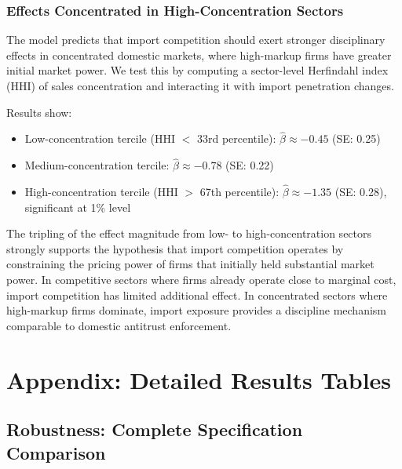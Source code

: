 \documentclass[12pt]{article}
\begin{document}
\subsubsection{Effects Concentrated in High-Concentration Sectors}

The model predicts that import competition should exert stronger disciplinary effects in concentrated domestic markets, where high-markup firms have greater initial market power. We test this by computing a sector-level Herfindahl index (HHI) of sales concentration and interacting it with import penetration changes.

Results show:
\begin{itemize}
    \item Low-concentration tercile (HHI $<$ 33rd percentile): $\hat{\beta} \approx -0.45$ (SE: 0.25)
    \item Medium-concentration tercile: $\hat{\beta} \approx -0.78$ (SE: 0.22)
    \item High-concentration tercile (HHI $>$ 67th percentile): $\hat{\beta} \approx -1.35$ (SE: 0.28), significant at 1\% level
\end{itemize}

The tripling of the effect magnitude from low- to high-concentration sectors strongly supports the hypothesis that import competition operates by constraining the pricing power of firms that initially held substantial market power. In competitive sectors where firms already operate close to marginal cost, import competition has limited additional effect. In concentrated sectors where high-markup firms dominate, import exposure provides a discipline mechanism comparable to domestic antitrust enforcement.

\pagebreak


\appendix

\section{Appendix: Detailed Results Tables}

\subsection{Robustness: Complete Specification Comparison}
\end{document}
